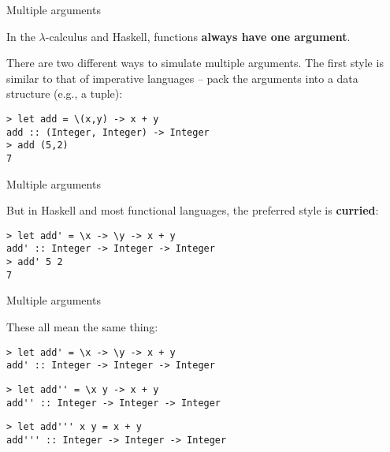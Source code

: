 %
\begin{frame}[fragile]{Multiple arguments}

In the $\lambda$-calculus and Haskell, functions \textbf{always have one
argument}.

There are two different ways to simulate multiple arguments. The first style is
similar to that of imperative languages -- pack the arguments into a data
structure (e.g., a tuple):

\begin{block}{}
\begin{verbatim}
> let add = \(x,y) -> x + y
add :: (Integer, Integer) -> Integer
> add (5,2)
7
\end{verbatim}
\end{block}

\end{frame}

%
\begin{frame}[fragile]{Multiple arguments}

But in Haskell and most functional languages, the preferred style is
\textbf{curried}:

\begin{block}{}
\begin{verbatim}
> let add' = \x -> \y -> x + y
add' :: Integer -> Integer -> Integer
> add' 5 2
7
\end{verbatim}
\end{block}

\end{frame}

%
\begin{frame}[fragile]{Multiple arguments}

These all mean the same thing:

\begin{block}{}
\begin{verbatim}
> let add' = \x -> \y -> x + y
add' :: Integer -> Integer -> Integer
\end{verbatim}
\end{block}

\begin{block}{}
\begin{verbatim}
> let add'' = \x y -> x + y
add'' :: Integer -> Integer -> Integer
\end{verbatim}
\end{block}

\begin{block}{}
\begin{verbatim}
> let add''' x y = x + y
add''' :: Integer -> Integer -> Integer
\end{verbatim}
\end{block}

\end{frame}

